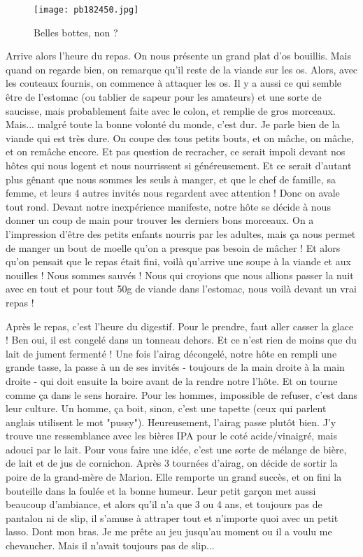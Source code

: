 \documentclass{book}
\begin{document}
\begin{figure}[h]
\centering
\texttt{[image: pb182450.jpg]}
\caption*{ Belles bottes, non ?}
\end{figure}

Arrive alors l'heure du repas. On nous présente un grand plat d'os bouillis. Mais quand on regarde bien, on remarque qu'il reste de la viande sur les os. Alors, avec les couteaux fournis, on commence à attaquer les os. Il y a aussi ce qui semble être de l'estomac (ou tablier de sapeur pour les amateurs) et une sorte de saucisse, mais probablement faite avec le colon, et remplie de gros morceaux. Mais... malgré toute la bonne volonté du monde, c'est dur. Je parle bien de la viande qui est très dure. On coupe des tous petits bouts, et on mâche, on mâche, et on remâche encore. Et pas question de recracher, ce serait impoli devant nos hôtes qui nous logent et nous nourrissent si généreusement. Et ce serait d'autant plus gênant que nous sommes les seuls à manger, et que le chef de famille, sa femme, et leurs 4 autres invités nous regardent avec attention ! Donc on avale tout rond. Devant notre inexpérience manifeste, notre hôte se décide à nous donner un coup de main pour trouver les derniers bons morceaux. On a l'impression d'être des petits enfants nourris par les adultes, mais ça nous permet de manger un bout de moelle qu'on a presque pas besoin de mâcher ! Et alors qu'on pensait que le repas était fini, voilà qu'arrive une soupe à la viande et aux nouilles ! Nous sommes sauvés ! Nous qui croyions que nous allions passer la nuit avec en tout et pour tout 50g de viande dans l'estomac, nous voilà devant un vrai repas !

Après le repas, c'est l'heure du digestif. Pour le prendre, faut aller casser la glace ! Ben oui, il est congelé dans un tonneau dehors. Et ce n'est rien de moins que du lait de jument fermenté ! Une fois l'airag décongelé, notre hôte en rempli une grande tasse, la passe à un de ses invités - toujours de la main droite à la main droite - qui doit ensuite la boire avant de la rendre notre l'hôte. Et on tourne comme ça dans le sens horaire. Pour les hommes, impossible de refuser, c'est dans leur culture. Un homme, ça boit, sinon, c'est une tapette (ceux qui parlent anglais utilisent le mot "pussy"). Heureusement, l'airag passe plutôt bien. J'y trouve une ressemblance avec les bières IPA pour le coté acide/vinaigré, mais adouci par le lait. Pour vous faire une idée, c'est une sorte de mélange de bière, de lait et de jus de cornichon.
Après 3 tournées d'airag, on décide de sortir la poire de la grand-mère de Marion. Elle remporte un grand succès, et on fini la bouteille dans la foulée et la bonne humeur. Leur petit garçon met aussi beaucoup d'ambiance, et alors qu'il n'a que 3 ou 4 ans, et toujours pas de pantalon ni de slip, il s'amuse à attraper tout et n'importe quoi avec un petit lasso. Dont mon bras. Je me prête au jeu jusqu'au moment ou il a voulu me chevaucher. Mais il n'avait toujours pas de slip...
\end{document}
